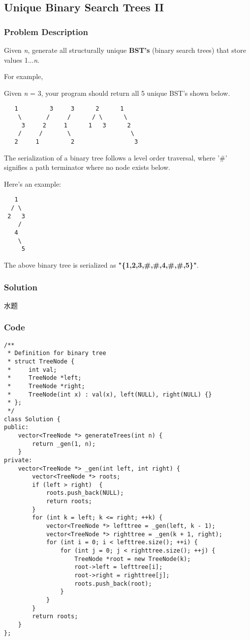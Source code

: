 \documentclass[courier]{article}
\begin{document}
\begin{CJK*}{UTF8}{gkai}
\subsection{ Unique Binary Search Trees II }

\subsubsection*{Problem Description}
Given \emph{n}, generate all structurally unique \textbf{BST's} (binary search trees) that store values 1...\emph{n}.

For example,


Given \emph{n} = 3, your program should return all 5 unique BST's shown below.

\begin{verbatim}
   1         3     3      2      1
    \       /     /      / \      \
     3     2     1      1   3      2
    /     /       \                 \
   2     1         2                 3
\end{verbatim}

The serialization of a binary tree follows a level order traversal, where '\#' signifies a path terminator where no node exists below.

Here's an example:


\begin{verbatim}
   1
  / \
 2   3
    /
   4
    \
     5
\end{verbatim}
The above binary tree is serialized as \textbf{"\{1,2,3,\#,\#,4,\#,\#,5\}"}.



\subsubsection*{Solution}
水题

\subsubsection*{Code}
\begin{lstlisting}
/**
 * Definition for binary tree
 * struct TreeNode {
 *     int val;
 *     TreeNode *left;
 *     TreeNode *right;
 *     TreeNode(int x) : val(x), left(NULL), right(NULL) {}
 * };
 */
class Solution {
public:
    vector<TreeNode *> generateTrees(int n) {
        return _gen(1, n);
    }
private:
    vector<TreeNode *> _gen(int left, int right) {
        vector<TreeNode *> roots;
        if (left > right)  {
            roots.push_back(NULL);
            return roots;
        }
        for (int k = left; k <= right; ++k) {
            vector<TreeNode *> lefttree = _gen(left, k - 1);
            vector<TreeNode *> righttree = _gen(k + 1, right);
            for (int i = 0; i < lefttree.size(); ++i) {
                for (int j = 0; j < righttree.size(); ++j) {
                    TreeNode *root = new TreeNode(k);
                    root->left = lefttree[i];
                    root->right = righttree[j];
                    roots.push_back(root);
                }
            }
        }
        return roots;
    }
}; 
\end{lstlisting}



\end{CJK*}
\end{document}
